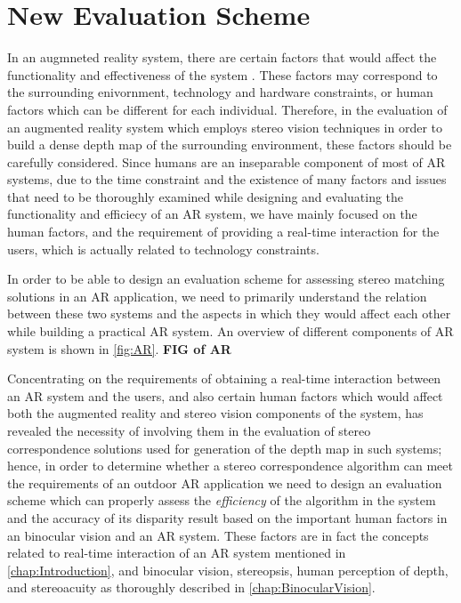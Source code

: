 \section{New Evaluation Scheme}

In an augmneted reality system, there are certain factors that would affect the functionality and effectiveness of the system \cite{dras96,liv05}. These factors may correspond to the surrounding 
enivornment, technology and hardware constraints, or human factors which can be different for each individual. Therefore, in the evaluation of an augmented reality system 
which employs stereo vision techniques in order to build a dense depth map of the surrounding environment, these factors should be carefully considered. 
Since humans are an inseparable component of most of AR systems, due to the time constraint and the existence of many factors and issues that need to be thoroughly 
examined while designing and evaluating the functionality and efficiecy of an AR system, we have mainly focused on the human factors, and the requirement of providing a real-time interaction for
the users, which is actually related to technology constraints. 

In order to be able to design an evaluation scheme for assessing stereo matching solutions in an AR application, we need to primarily understand the relation between these two systems and
the aspects in which they would affect each other while building a practical AR system. An overview of different components of AR system is shown in \ref{fig:AR}.
\textbf{FIG of AR}

Concentrating on the requirements of obtaining a real-time interaction between an AR system and the users, and
also certain human factors which would affect both the augmented reality and stereo vision components of the system,
has revealed the necessity of involving them in the evaluation of stereo correspondence solutions used for generation of the depth map in such systems; hence, in order to 
determine whether a stereo correspondence algorithm can meet the requirements of an outdoor AR application we need to design an evaluation scheme which can properly assess 
the \textit{efficiency} of the algorithm in the system and the accuracy of its disparity result based on the important human factors in an binocular vision and an AR system.
These factors are in fact the concepts related to real-time interaction of an AR system mentioned in \ref{chap:Introduction}, and binocular vision, stereopsis, human perception of depth, 
and stereoacuity as thoroughly described in \ref{chap:BinocularVision}.

